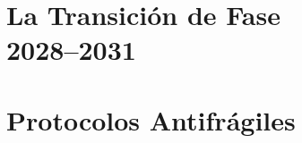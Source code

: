 \documentclass[12pt, twoside]{book}
\theoremstyle{plain}
\theoremstyle{definition}
\theoremstyle{remark}
\begin{document}
\part[La Transici\'{o}n de Fase 2028--2031]{La Transici\'{o}n de Fase\\2028--2031}




\part{Protocolos Antifr\'{a}giles}




\appendix





\end{document}
